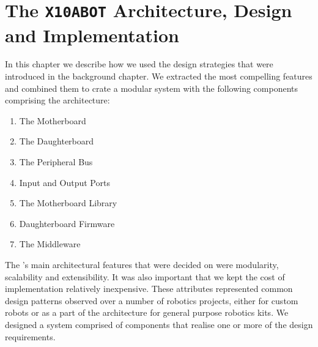 \chapter{The \texttt{X10ABOT} Architecture, Design and Implementation}%
\label{cha:the_x10abot_architecture_design_and_implementation}


In this chapter we describe how we used the design strategies that were introduced in the background chapter. We extracted the most compelling features and combined them to crate a modular system with the following components comprising the \xten architecture:
\begin{enumerate}
\item The Motherboard
\item The Daughterboard
\item The Peripheral Bus
\item Input and Output Ports
\item The Motherboard Library
\item Daughterboard Firmware
\item The Middleware
\end{enumerate}



The \xten 's main architectural features that were decided on were modularity, scalability and extensibility. It was also important that we kept the cost of implementation relatively inexpensive. These attributes represented common design patterns observed over a number of robotics projects, either for custom robots or as a part of the architecture for general purpose robotics kits. We designed a system comprised of components that realise one or more of the design requirements.

\newpage
